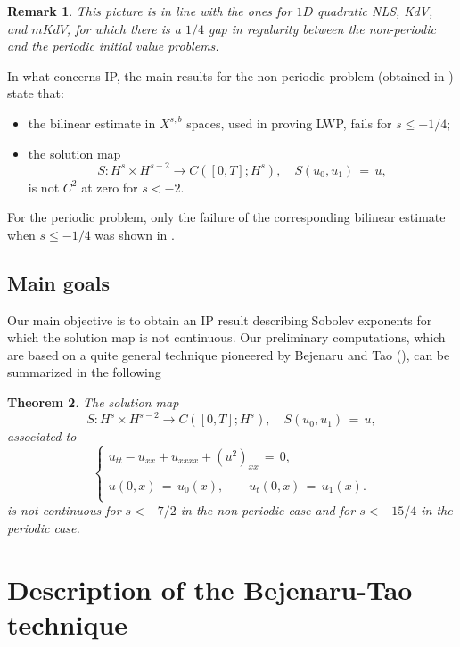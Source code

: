 \documentclass{amsart}
\newtheorem{theorem}{Theorem}[section]
\newtheorem{remark}[theorem]{Remark}
\begin{document}
\begin{remark}
This picture is in line with the ones for $1D$ quadratic NLS, KdV, and $mKdV$, for which there is a $1/4$ gap in regularity between the non-periodic and the periodic initial value problems. 
\end{remark}

In what concerns IP, the main results for the non-periodic problem (obtained in \cite{Farah:2009uq}) state that:
\begin{itemize}
\item the bilinear estimate in $X^{s,b}$ spaces, used in proving LWP, fails for $s\leq -1/4$;

\item the solution map 
\[
S: H^s\times H^{s-2} \to C([0,T]; H^s), \quad
S(u_0,u_1)\,=\,u,
\]
is not $C^2$ at zero for $s<-2$.
\end{itemize}

For the periodic problem, only the failure of the corresponding bilinear estimate when $s\leq -1/4$ was shown in \cite{Farah:2010ys}.

\subsection{Main goals} Our main objective is to obtain an IP result describing Sobolev exponents for which the solution map is not continuous. Our preliminary computations, which are based on a quite general technique pioneered by Bejenaru and Tao (\cite{Bejenaru-Tao-2006-Sharp-well-posedness-and-ill-posedness}), can be summarized in the following

\begin{theorem}
The solution map 
\[
S: H^s\times H^{s-2} \to C([0,T]; H^s), \quad
S(u_0,u_1)\,=\,u,
\]
associated to 
\begin{equation}
\left\{
\begin{array}{l}
u_{tt}-u_{xx}+u_{xxxx}+(u^2)_{xx}\,=\,0,\\
\\
u(0,x)\,=\,u_0(x),\qquad u_t(0,x)\,=\,u_1(x).\\
\end{array}\right.
\label{chs}
\end{equation}
is not continuous for $s<-7/2$ in the non-periodic case and for $s<-15/4$ in the periodic case.
\label{mth}
\end{theorem}

\section{Description of the Bejenaru-Tao technique}
\end{document}
